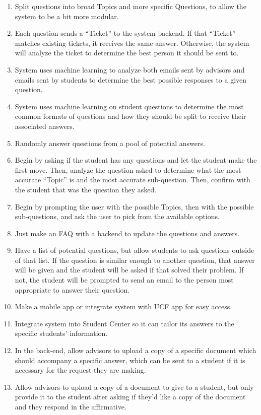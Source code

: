 \documentclass[titlepage, 12pt]{article}
\begin{document}
\begin{enumerate}
    \item Split questions into broad Topics and more specific Questions, to allow the system to be a bit more modular.
    \item Each question sends a “Ticket” to the system backend. If that “Ticket” matches existing tickets, it receives the same answer. Otherwise, the system will analyze the ticket to determine the best person it should be sent to.
    \item System uses machine learning to analyze both emails sent by advisors and emails sent by students to determine the best possible responses to a given question.
    \item System uses machine learning on student questions to determine the most common formats of questions and how they should be split to receive their associated answers.
    \item Randomly answer questions from a pool of potential answers.
    \item Begin by asking if the student has any questions and let the student make the first move. Then, analyze the question asked to determine what the most accurate “Topic” is and the most accurate sub-question. Then, confirm with the student that was the question they asked.
    \item Begin by prompting the user with the possible Topics, then with the possible sub-questions, and ask the user to pick from the available options.
    \item Just make an FAQ with a backend to update the questions and answers.
    \item Have a list of potential questions, but allow students to ask questions outside of that list. If the question is similar enough to another question, that answer will be given and the student will be asked if that solved their problem. If not, the student will be prompted to send an email to the person most appropriate to answer their question.
    \item Make a mobile app or integrate system with UCF app for easy access.
    \item Integrate system into Student Center so it can tailor its answers to the specific students’ information.
    \item In the back-end, allow advisors to upload a copy of a specific document which should accompany a specific answer, which can be sent to a student if it is necessary for the request they are making.
    \item Allow advisors to upload a copy of a document to give to a student, but only provide it to the student after asking if they’d like a copy of the document and they respond in the affirmative.

\end{enumerate}
\end{document}
